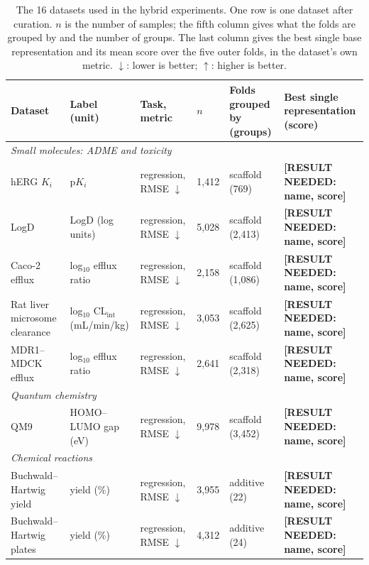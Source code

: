 \begin{table}[htbp]
\centering
\footnotesize
\setlength{\tabcolsep}{3pt}
\caption{The 16 datasets used in the hybrid experiments. One row is one dataset after curation. $n$ is the number of samples; the fifth column gives what the folds are grouped by and the number of groups. The last column gives the best single base representation and its mean score over the five outer folds, in the dataset's own metric. $\downarrow$: lower is better; $\uparrow$: higher is better.}
\label{tab:datasets}
\begin{tabular}{p{2.6cm}p{2.5cm}p{2.0cm}p{1.0cm}p{2.4cm}p{2.4cm}}
\toprule
Dataset & Label (unit) & Task, metric & $n$ & Folds grouped by (groups) & Best single representation (score) \\
\midrule
\multicolumn{6}{l}{\textit{Small molecules: ADME and toxicity}} \\
hERG $K_i$ \citep{Zdrazil2023} & p$K_i$ & regression, RMSE $\downarrow$ & 1,412 & scaffold (769) & \textbf{[RESULT NEEDED: name, score]} \\
LogD \citep{openadmet} & LogD (log units) & regression, RMSE $\downarrow$ & 5,028 & scaffold (2,413) & \textbf{[RESULT NEEDED: name, score]} \\
Caco-2 efflux \citep{openadmet} & log$_{10}$ efflux ratio & regression, RMSE $\downarrow$ & 2,158 & scaffold (1,086) & \textbf{[RESULT NEEDED: name, score]} \\
Rat liver microsome clearance \citep{fang2023, polaris} & log$_{10}$ CL$_\text{int}$ (mL/min/kg) & regression, RMSE $\downarrow$ & 3,053 & scaffold (2,625) & \textbf{[RESULT NEEDED: name, score]} \\
MDR1--MDCK efflux \citep{fang2023, polaris} & log$_{10}$ efflux ratio & regression, RMSE $\downarrow$ & 2,641 & scaffold (2,318) & \textbf{[RESULT NEEDED: name, score]} \\
\midrule
\multicolumn{6}{l}{\textit{Quantum chemistry}} \\
QM9 \citep{Ramakrishnan2014, qm9_dataset} & HOMO--LUMO gap (eV) & regression, RMSE $\downarrow$ & 9,978 & scaffold (3,452) & \textbf{[RESULT NEEDED: name, score]} \\
\midrule
\multicolumn{6}{l}{\textit{Chemical reactions}} \\
Buchwald--Hartwig yield \citep{Ahneman2018} & yield (\%) & regression, RMSE $\downarrow$ & 3,955 & additive (22) & \textbf{[RESULT NEEDED: name, score]} \\
Buchwald--Hartwig plates \citep{Ahneman2018} & yield (\%) & regression, RMSE $\downarrow$ & 4,312 & additive (24) & \textbf{[RESULT NEEDED: name, score]} \\

\end{tabular}
\end{table}
